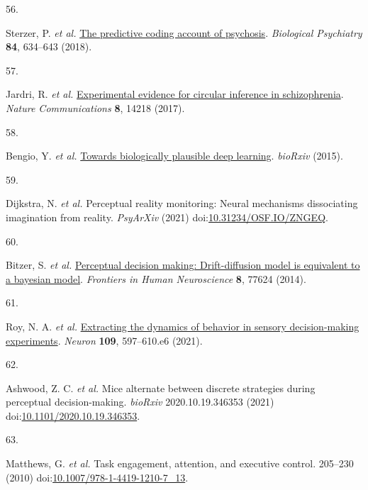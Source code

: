 \documentclass[
]{article}
\newlength{\cslhangindent}
\newlength{\csllabelwidth}
\newlength{\cslentryspacingunit} %
\newenvironment{CSLReferences}[2] %
 {%
  \setlength{\parindent}{0pt}
  \ifodd #1
  \let\oldpar\par
  \def\par{\hangindent=\cslhangindent\oldpar}
  \fi
  \setlength{\parskip}{#2\cslentryspacingunit}
 }%
 {}
\newcommand{\CSLLeftMargin}[1]{\parbox[t]{\csllabelwidth}{#1}}
\newcommand{\CSLRightInline}[1]{\parbox[t]{\linewidth - \csllabelwidth}{#1}\break}
\begin{document}
\begin{CSLReferences}{0}{0}
\leavevmode{}%
\CSLLeftMargin{56. }%
\CSLRightInline{Sterzer, P. \emph{et al.}
\href{https://doi.org/10.1016/j.biopsych.2018.05.015}{The predictive
coding account of psychosis}. \emph{Biological Psychiatry} \textbf{84},
634--643 (2018).}

\leavevmode{}%
\CSLLeftMargin{57. }%
\CSLRightInline{Jardri, R. \emph{et al.}
\href{https://doi.org/10.1038/ncomms14218}{Experimental evidence for
circular inference in schizophrenia}. \emph{Nature Communications}
\textbf{8}, 14218 (2017).}

\leavevmode{}%
\CSLLeftMargin{58. }%
\CSLRightInline{Bengio, Y. \emph{et al.}
\href{http://arxiv.org/abs/1502.04156}{Towards biologically plausible
deep learning}. \emph{bioRxiv} (2015).}

\leavevmode{}%
\CSLLeftMargin{59. }%
\CSLRightInline{Dijkstra, N. \emph{et al.} Perceptual reality
monitoring: Neural mechanisms dissociating imagination from reality.
\emph{PsyArXiv} (2021)
doi:\href{https://doi.org/10.31234/OSF.IO/ZNGEQ}{10.31234/OSF.IO/ZNGEQ}.}

\leavevmode{}%
\CSLLeftMargin{60. }%
\CSLRightInline{Bitzer, S. \emph{et al.}
\href{https://doi.org/10.3389/FNHUM.2014.00102/BIBTEX}{Perceptual
decision making: Drift-diffusion model is equivalent to a bayesian
model}. \emph{Frontiers in Human Neuroscience} \textbf{8}, 77624
(2014).}

\leavevmode{}%
\CSLLeftMargin{61. }%
\CSLRightInline{Roy, N. A. \emph{et al.}
\href{https://doi.org/10.1016/J.NEURON.2020.12.004}{Extracting the
dynamics of behavior in sensory decision-making experiments}.
\emph{Neuron} \textbf{109}, 597--610.e6 (2021).}

\leavevmode{}%
\CSLLeftMargin{62. }%
\CSLRightInline{Ashwood, Z. C. \emph{et al.} Mice alternate between
discrete strategies during perceptual decision-making. \emph{bioRxiv}
2020.10.19.346353 (2021)
doi:\href{https://doi.org/10.1101/2020.10.19.346353}{10.1101/2020.10.19.346353}.}

\leavevmode{}%
\CSLLeftMargin{63. }%
\CSLRightInline{Matthews, G. \emph{et al.} Task engagement, attention,
and executive control. 205--230 (2010)
doi:\href{https://doi.org/10.1007/978-1-4419-1210-7_13}{10.1007/978-1-4419-1210-7\_13}.}


\end{CSLReferences}
\end{document}
